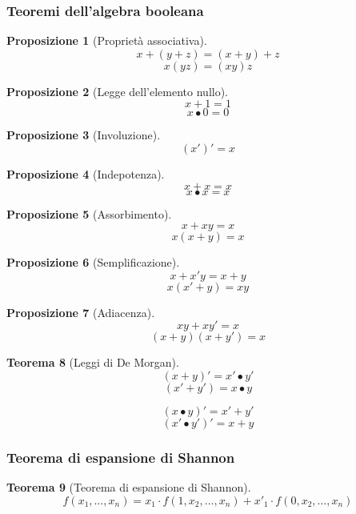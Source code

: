 \documentclass[a4paper,12pt]{article}
\theoremstyle{mystyle}
\newtheorem{theorem}{Teorema}[section]
\newtheorem{proposition}[theorem]{Proposizione}
\begin{document}
\subsubsection{Teoremi dell'algebra booleana}
\begin{proposition}[Proprietà associativa]
    \[
        x+(y+z) = (x+y) +z
    \]
    \[
        x(yz)=(xy)z
    \]
\end{proposition}

\begin{proposition}[Legge dell'elemento nullo]
    \[
        x+1=1
    \]
    \[
        x \bullet 0 =0
    \]
\end{proposition}

\begin{proposition}[Involuzione]
    \[
        (x')'=x
    \]
\end{proposition}

\begin{proposition}[Indepotenza]
    \[
        x+x=x
    \]
    \[
        x \bullet x = x
    \]
\end{proposition}

\begin{proposition}[Assorbimento]
    \[
        x+xy=x
    \]
    \[
        x(x+y)=x
    \]
\end{proposition}

\begin{proposition}[Semplificazione]
    \[
        x+x'y=x+y
    \]
    \[
        x(x'+y)=xy
    \]
\end{proposition}

\begin{proposition}[Adiacenza]
    \[
        xy + xy' = x
    \]
    \[
        (x+y)(x+y')=x
    \]
\end{proposition}

\begin{theorem}[Leggi di De Morgan]
    \[
        (x+y)' = x' \bullet y'
    \]
    \[
        (x'+y') = x \bullet y
    \]

    \[  
        (x \bullet y)' = x' + y'
    \]
    \[
        (x' \bullet y')' = x+y
    \]
\end{theorem}

\subsubsection{Teorema di espansione di Shannon}

\begin{theorem}[Teorema di espansione di Shannon]
    \[
        f(x_1, \ldots , x_n) = x_1 \cdot f(1,x_2, \ldots, x_n) + x'_1 \cdot f (0, x_2, \ldots, x_n)
    \]
\end{theorem}
\end{document}
